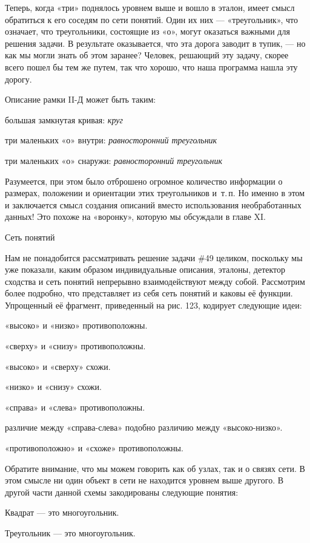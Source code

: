 \documentclass[../main.tex]{subfiles}
\begin{document}
Теперь, когда «три» поднялось уровнем выше и вошло в эталон, имеет смысл обратиться к его соседям по сети понятий. Один их них --- «треугольник», что означает, что треугольники, состоящие из «о», могут оказаться важными для решения задачи. В результате оказывается, что эта дорога заводит в тупик, --- но как мы могли знать об этом заранее? Человек, решающий эту задачу, скорее всего пошел бы тем же путем, так что хорошо, что наша программа нашла эту дорогу.

Описание рамки II-Д может быть таким:

большая замкнутая кривая: \emph{круг}

три маленьких «о» внутри: \emph{равносторонний треугольник}

три маленьких «о» снаружи: \emph{равносторонний треугольник}

Разумеется, при этом было отброшено огромное количество информации о размерах, положении и ориентации этих треугольников и~т.\,п. Но именно в этом и заключается смысл создания описаний вместо использования необработанных данных! Это похоже на «воронку», которую мы обсуждали в главе XI.

Сеть понятий

Нам не понадобится рассматривать решение задачи \#49 целиком, поскольку мы уже показали, каким образом индивидуальные описания, эталоны, детектор сходства и сеть понятий непрерывно взаимодействуют между собой. Рассмотрим более подробно, что представляет из себя сеть понятий и каковы её функции. Упрощенный её фрагмент, приведенный на рис. 123, кодирует следующие идеи:

«высоко» и «низко» противоположны.

«сверху» и «снизу» противоположны.

«высоко» и «сверху» схожи.

«низко» и «снизу» схожи.

«справа» и «слева» противоположны.

различие между «справа-слева» подобно различию между «высоко-низко».

«противоположно» и «схоже» противоположны.

Обратите внимание, что мы можем говорить как об узлах, так и о связях сети. В этом смысле ни один объект в сети не находится уровнем выше другого. В другой части данной схемы закодированы следующие понятия:

Квадрат --- это многоугольник.

Треугольник --- это многоугольник.
\end{document}
